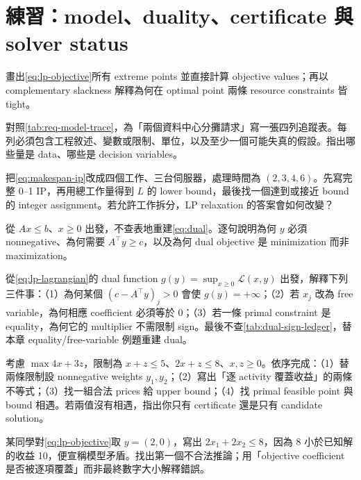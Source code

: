 \documentclass[11pt,a4paper,oneside,openany]{book}
\begin{document}
\section{練習：model、duality、certificate 與 solver status}
\begin{exercise}
\label{ex:lp-corners}
畫出\cref{eq:lp-objective}所有 extreme points 並直接計算 objective values；再以 complementary slackness 解釋為何在 optimal point 兩條 resource constraints 皆 tight。
\end{exercise}
\begin{exercise}
對照\cref{tab:req-model-trace}，為「兩個資料中心分攤請求」寫一張四列追蹤表。每列必須包含工程敘述、變數或限制、單位，以及至少一個可能失真的假設。指出哪些量是 data、哪些是 decision variables。
\end{exercise}
\begin{exercise}
\label{ex:load-ip}
把\cref{eq:makespan-ip}改成四個工作、三台伺服器，處理時間為 $(2,3,4,6)$。先寫完整 0--1 IP，再用總工作量得到 $L$ 的 lower bound，最後找一個達到或接近 bound 的 integer assignment。若允許工作拆分，LP relaxation 的答案會如何改變？
\end{exercise}
\begin{exercise}
從 $Ax\le b$、$x\ge0$ 出發，不查表地重建\cref{eq:dual}。逐句說明為何 $y$ 必須 nonnegative、為何需要 $A^\top y\ge c$，以及為何 dual objective 是 minimization 而非 maximization。
\end{exercise}
\begin{exercise}
從\cref{eq:lp-lagrangian}的 dual function $g(y)=\sup_{x\ge0}\mathcal L(x,y)$ 出發，解釋下列三件事：（1）為何某個 $(c-A^\top y)_j>0$ 會使 $g(y)=+\infty$；（2）若 $x_j$ 改為 free variable，為何相應 coefficient 必須等於 0；（3）若一條 primal constraint 是 equality，為何它的 multiplier 不需限制 sign。最後不查\cref{tab:dual-sign-ledger}，替本章 equality/free-variable 例題重建 dual。
\end{exercise}
\begin{exercise}
\label{ex:dual-guided}
考慮 $\max 4x+3z$，限制為 $x+z\le5$、$2x+z\le8$、$x,z\ge0$。依序完成：（1）替兩條限制設 nonnegative weights $y_1,y_2$；（2）寫出「逐 activity 覆蓋收益」的兩條不等式；（3）找一組合法 prices 給 upper bound；（4）找 primal feasible point 與 bound 相遇。若兩值沒有相遇，指出你只有 certificate 還是只有 candidate solution。
\end{exercise}
\begin{exercise}
某同學對\cref{eq:lp-objective}取 $y=(2,0)$，寫出 $2x_1+2x_2\le8$，因為 8 小於已知解的收益 10，便宣稱模型矛盾。找出第一個不合法推論；用「objective coefficient 是否被逐項覆蓋」而非最終數字大小解釋錯誤。
\end{exercise}
\end{document}
